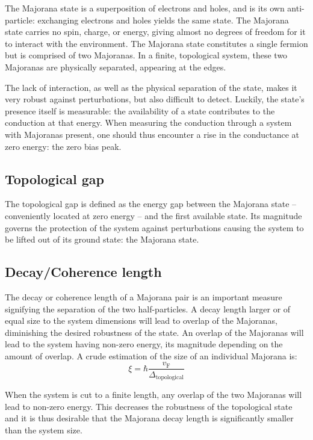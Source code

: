         The Majorana state is a superposition of electrons and holes, and is its own anti-particle: exchanging electrons and holes yields the same state.
        The Majorana state carries no spin, charge, or energy, giving almost no degrees of freedom for it to interact with the environment.
        The Majorana state constitutes a single fermion but is comprised of two Majoranas.
        In a finite, topological system, these two Majoranas are physically separated, appearing at the edges.

        The lack of interaction, as well as the physical separation of the state, makes it very robust against perturbations, but also difficult to detect.
        Luckily, the state's presence itself is measurable: the availability of a state contributes to the conduction at that energy.
        When measuring the conduction through a system with Majoranas present, one should thus encounter a rise in the conductance at zero energy: the zero bias peak.

    \subsection{Topological gap}
        The topological gap is defined as the energy gap between the Majorana state -- conveniently located at zero energy -- and the first available state.
        Its magnitude governs the protection of the system against perturbations causing the system to be lifted out of its ground state: the Majorana state.

    \subsection{Decay/Coherence length}
        The decay or coherence length of a Majorana pair is an important measure signifying the separation of the two half-particles.
        A decay length larger or of equal size to the system dimensions will lead to overlap of the Majoranas, diminishing the desired robustness of the state.
        An overlap of the Majoranas will lead to the system having non-zero energy, its magnitude depending on the amount of overlap.
        A crude estimation of the size of an individual Majorana is:
        \begin{equation}
            \xi = \hbar \frac{v_\text{F}}{\Delta_\text{topological}}
            \label{eq:majorana_coherence_length}
        \end{equation}

        When the system is cut to a finite length, any overlap of the two Majoranas will lead to non-zero energy.
        This decreases the robustness of the topological state and it is thus desirable that the Majorana decay length is significantly smaller than the system size.

